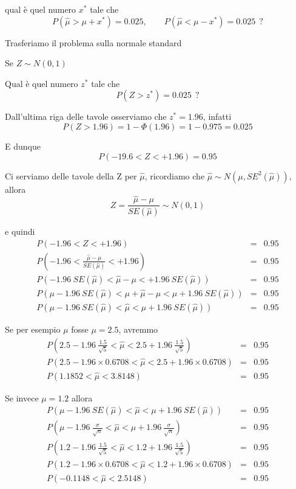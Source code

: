 \documentclass[
  11pt,
]{book}
\theoremstyle{mytheoremstyle}
\theoremstyle{mydefstyle}
\begin{document}
qual è quel numero \(x^*\) tale che
\[P(\hat \mu>\mu+x^*)=0.025,\qquad P(\hat \mu < \mu - x^*)=0.025 ~~?\]

Trasferiamo il problema sulla normale standard

Se \(Z\sim N(0,1)\)

Qual è quel numero \(z^*\) tale che
\[P(Z>z^*)=0.025 ~~?\]

Dall'ultima riga delle tavole osserviamo che \(z^*=1.96\), infatti
\[P(Z>1.96)=1- \Phi(1.96)=1-0.975=0.025 \]

E dunque
\[P(-19.6<Z<+1.96)=0.95\]

Ci serviamo delle tavole della Z per \(\hat \mu\), ricordiamo che \(\hat \mu\sim N(\mu,SE^2(\hat \mu))\), allora
\[Z=\frac{\hat \mu-\mu}{SE(\hat \mu)}\sim N(0,1)\]

e quindi
\begin{eqnarray*}
  P(-1.96<Z<+1.96) &=& 0.95 \\
  P\left(-1.96<\frac{\hat \mu -\mu}{SE(\hat \mu)}< +1.96\right) &=& 0.95 \\
  P\left(-1.96~SE(\hat \mu)<\hat \mu -\mu< +1.96~SE(\hat \mu)\right) &=& 0.95 \\  
  P\left(\mu-1.96~SE(\hat \mu)<\mu+\hat \mu -\mu< \mu+1.96~SE(\hat \mu)\right) &=& 0.95 \\    
  P(\mu-1.96~SE(\hat \mu)<\hat \mu<\mu+1.96~SE(\hat \mu)) &=& 0.95
\end{eqnarray*}

Se per esempio \(\mu\) fosse \(\mu=2.5\), avremmo
\begin{eqnarray*}
  P\left(2.5-1.96~\frac{1.5}{\sqrt{5}}<\hat \mu < 2.5+1.96~\frac{1.5}{\sqrt{5}}\right) &=& 0.95 \\
  P\left(2.5-1.96\times0.6708<\hat \mu < 2.5+1.96\times0.6708\right) &=& 0.95 \\
  P(1.1852 < \hat \mu < 3.8148) &=& 0.95 
\end{eqnarray*}

Se invece \(\mu= 1.2\) allora
\begin{eqnarray*}
  P(\mu-1.96~SE(\hat \mu)<\hat \mu<\mu+1.96~SE(\hat \mu)) &=& 0.95\\
  P\left(\mu-1.96~\frac{\sigma}{\sqrt n}<\hat \mu < \mu+1.96~\frac{\sigma}{\sqrt n}\right) &=& 0.95 \\
  P\left(1.2-1.96~\frac{1.5}{\sqrt{5}}<\hat \mu < 1.2+1.96~\frac{1.5}{\sqrt{5}}\right) &=& 0.95 \\
  P\left(1.2-1.96\times0.6708<\hat \mu < 1.2+1.96\times0.6708\right) &=& 0.95 \\
  P(-0.1148 < \hat \mu < 2.5148) &=& 0.95 
\end{eqnarray*}
\end{document}
